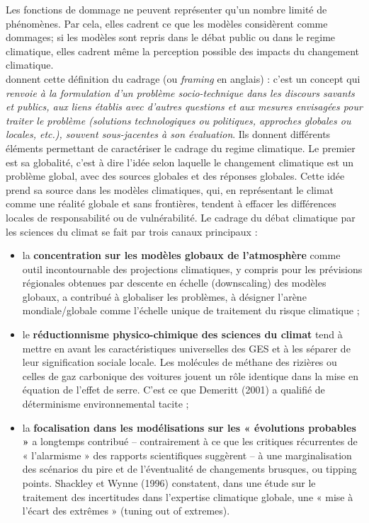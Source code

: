 Les fonctions de dommage ne peuvent représenter qu'un nombre limité de phénomènes. Par cela, elles cadrent ce que les modèles considèrent comme dommages; si les modèles sont repris dans le débat public ou dans le \gls{regime climatique}, elles cadrent même la perception possible des impacts du changement climatique. \\

\textcite{aykut_gouverner_nodate} donnent cette définition du cadrage (ou \emph{framing} en anglais) : c'est un concept qui  \emph{renvoie à la formulation d’un problème socio-technique dans les discours savants et publics, aux liens établis avec d’autres questions et aux mesures envisagées pour traiter le problème (solutions technologiques ou politiques, approches globales ou locales, etc.), souvent sous-jacentes à son évaluation}. Ils donnent différents éléments permettant de caractériser le cadrage du \gls{regime climatique}. Le premier est sa globalité, c'est à dire l'idée selon laquelle le changement climatique est un problème global, avec des sources globales et des réponses globales. Cette idée prend sa source dans les modèles climatiques, qui, en représentant le climat comme une réalité globale et sans frontières, tendent à effacer les différences locales de responsabilité ou de vulnérabilité. Le cadrage du débat climatique par les sciences du climat se fait par trois canaux principaux : 



\begin{authoredquote}
    \begin{itemize}
    \item la \textbf{concentration sur les modèles globaux de l’atmosphère} comme outil incontournable des projections climatiques, y compris pour les prévisions régionales obtenues par descente en échelle (downscaling) des modèles globaux, a contribué à globaliser les problèmes, à désigner l’arène mondiale/globale comme l’échelle unique de traitement du risque climatique ;
	\item le \textbf{réductionnisme physico-chimique des sciences du climat} tend à mettre en avant les caractéristiques universelles des GES et à les séparer de leur signification sociale locale. Les molécules de méthane des rizières ou celles de gaz carbonique des voitures jouent un rôle identique dans la mise en équation de l’effet de serre. C’est ce que Demeritt (2001) a qualifié de déterminisme environnemental tacite ;
	\item la \textbf{focalisation dans les modélisations sur les « évolutions probables »} a longtemps contribué – contrairement à ce que les critiques récurrentes de « l’alarmisme » des rapports scientifiques suggèrent – à une marginalisation des scénarios du pire et de l’éventualité de changements brusques, ou tipping points. Shackley et Wynne (1996) constatent, dans une étude sur le traitement des incertitudes dans l’expertise climatique globale, une « mise à l’écart des extrêmes » (tuning out of extremes).
\end{itemize}



\end{authoredquote}

